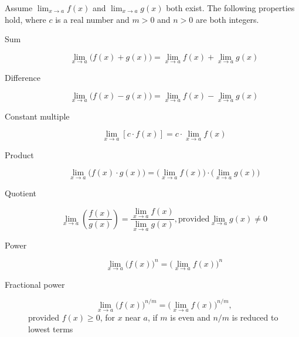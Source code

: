 \documentclass[nooutcomes]{ximera}
\begin{document}
  Assume $\lim_{x \to a} f(x)$ and $\lim_{x \to a} g(x)$ both exist.
  The following properties hold, where $c$ is a real number and $m > 0$ and $n > 0$ are both integers.
  \begin{description}
      \item[Sum]
        \[
          \lim_{x \to a} \bigl(f(x) + g(x)\bigr) = \lim_{x \to a} f(x) + \lim_{x \to a} g(x)
        \]

      \item[Difference]
        \[
          \lim_{x \to a} \bigl(f(x) - g(x)\bigr) = \lim_{x \to a} f(x) - \lim_{x \to a} g(x)
        \]

      \item[Constant multiple]
        \[
          \lim_{x \to a} \left[c \cdot f(x) \right] = c \cdot \lim_{x \to a} f(x)
        \]

      \item[Product]
        \[
          \lim_{x \to a} \bigl(f(x) \cdot g(x)\bigr) = \bigl(\lim_{x \to a} f(x)\bigr) \cdot \bigl(\lim_{x \to a} g(x) \bigr)
        \]

      \item[Quotient]
        \[
          \lim_{x \to a} \left(\frac{f(x)}{g(x)}\right) = \frac{\lim_{x \to a} f(x)}{\lim_{x \to a} g(x)}, \text{provided} \lim_{x \to a} g(x) \ne 0
        \]   

      \item[ Power]
        \[
          \lim_{x \to a} \bigl(f(x)\bigr)^n = \bigl(\lim_{x \to a} f(x)\bigr)^n
        \]

      \item[Fractional power]
        \[
          \lim_{x \to a} \bigl(f(x)\bigr)^{n/m} = \bigl(\lim_{x \to a} f(x)\bigr)^{n/m},
        \]
        provided $f(x) \ge 0$, for $x$ near $a$, if $m$ is even and $n/m$ is reduced to lowest terms
    \end{description}
\end{document}
